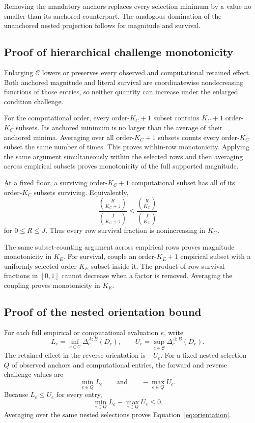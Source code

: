 \documentclass[11pt]{article}
\newcommand{\CSet}{\mathcal{C}}
\theoremstyle{remark}
\begin{document}
Removing the mandatory anchors replaces every selection minimum by a value no
smaller than its anchored counterpart. The analogous domination of the
unanchored nested projection follows for magnitude and survival.

\subsection{Proof of hierarchical challenge monotonicity}

Enlarging $\CSet$ lowers or preserves every observed and computational retained
effect. Both anchored magnitude and literal survival are coordinatewise
nondecreasing functions of those entries, so neither quantity can increase
under the enlarged condition challenge.

For the computational order, every order-$K_C+1$ subset contains
$K_C+1$ order-$K_C$ subsets. Its anchored minimum is no larger than the
average of their anchored minima. Averaging over all order-$K_C+1$ subsets
counts every order-$K_C$ subset the same number of times. This proves
within-row monotonicity. Applying the same argument simultaneously within the
selected rows and then averaging across empirical subsets proves monotonicity
of the full supported magnitude.

At a fixed floor, a surviving order-$K_C+1$ computational subset has all of
its order-$K_C$ subsets surviving. Equivalently,
\[
\frac{\binom{R}{K_C+1}}{\binom{J}{K_C+1}}
\leq
\frac{\binom{R}{K_C}}{\binom{J}{K_C}}
\]
for $0\leq R\leq J$. Thus every row survival fraction is nonincreasing in
$K_C$.

The same subset-counting argument across empirical rows proves magnitude
monotonicity in $K_E$. For survival, couple an order-$K_E+1$ empirical subset
with a uniformly selected order-$K_E$ subset inside it. The product of row
survival fractions in $[0,1]$ cannot decrease when a factor is removed.
Averaging the coupling proves monotonicity in $K_E$.

\subsection{Proof of the nested orientation bound}

For each full empirical or computational evaluation $e$, write
\[
L_e=\inf_{c\in\CSet}\Delta_c^{A:B}(D_e),
\qquad
U_e=\sup_{c\in\CSet}\Delta_c^{A:B}(D_e).
\]
The retained effect in the reverse orientation is $-U_e$. For a fixed nested
selection $Q$ of observed anchors and computational entries, the forward and
reverse challenge values are
\[
\min_{e\in Q}L_e
\qquad\text{and}\qquad
-\max_{e\in Q}U_e.
\]
Because $L_e\leq U_e$ for every entry,
\[
\min_{e\in Q}L_e-\max_{e\in Q}U_e\leq0.
\]
Averaging over the same nested selections proves
Equation~\eqref{eq:orientation}.
\end{document}
